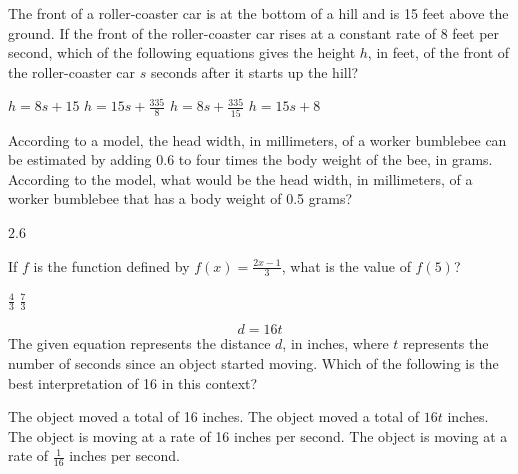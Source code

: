 \question[1]
The front of a roller-coaster car is at the bottom of a hill and is 15 feet above the ground. If the front of the roller-coaster car rises at a constant rate of 8 feet per second, which of the following equations gives the height $h$, in feet, of the front of the roller-coaster car $s$ seconds after it starts up the hill?
\begin{choices}
  \CorrectChoice $h = 8s + 15$
  \choice $h = 15s + \frac{335}{8}$
  \choice $h = 8s + \frac{335}{15}$
  \choice $h = 15s + 8$
\end{choices}

\newpage

\question[1]
According to a model, the head width, in millimeters, of a worker bumblebee can be estimated by adding 0.6 to four times the body weight of the bee, in grams. According to the model, what would be the head width, in millimeters, of a worker bumblebee that has a body weight of 0.5 grams?
\begin{solutionorbox}
$2.6$
\end{solutionorbox}


\question[1]
If $f$ is the function defined by $f(x) = \frac{2x-1}{3}$, what is the value of $f(5)$?
\begin{choices}
  \choice $\frac{4}{3}$
  \choice $\frac{7}{3}$
\end{choices}

\question[1]
$$
d = 16t
$$
The given equation represents the distance $d$, in inches, where $t$ represents the number of seconds since an object started moving. Which of the following is the best interpretation of 16 in this context?
\begin{choices}
  \choice The object moved a total of 16 inches.
  \choice The object moved a total of $16t$ inches.
  \CorrectChoice The object is moving at a rate of 16 inches per second.
  \choice The object is moving at a rate of $\frac{1}{16}$ inches per second.
\end{choices}

\newpage


